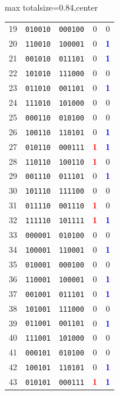 \documentclass[11pt]{article}
\theoremstyle{definition}
\begin{document}
\begin{table}[p]
\begin{adjustbox}{max totalsize={\textwidth}{0.84\textheight},center}
\begin{tabular}{@{}rcccc@{}}
19 & \texttt{010010} & \texttt{000100} & 0 & 0 \\
20 & \texttt{110010} & \texttt{100001} & 0 & \textbf{\textcolor{blue}{1}} \\
21 & \texttt{001010} & \texttt{011101} & 0 & \textbf{\textcolor{blue}{1}} \\
22 & \texttt{101010} & \texttt{111000} & 0 & 0 \\
23 & \texttt{011010} & \texttt{001101} & 0 & \textbf{\textcolor{blue}{1}} \\
24 & \texttt{111010} & \texttt{101000} & 0 & 0 \\
25 & \texttt{000110} & \texttt{010100} & 0 & 0 \\
26 & \texttt{100110} & \texttt{110101} & 0 & \textbf{\textcolor{blue}{1}} \\
27 & \texttt{010110} & \texttt{000111} & \textbf{\textcolor{red}{1}} & \textbf{\textcolor{blue}{1}} \\
28 & \texttt{110110} & \texttt{100110} & \textbf{\textcolor{red}{1}} & 0 \\
29 & \texttt{001110} & \texttt{011101} & 0 & \textbf{\textcolor{blue}{1}} \\
30 & \texttt{101110} & \texttt{111100} & 0 & 0 \\
31 & \texttt{011110} & \texttt{001110} & \textbf{\textcolor{red}{1}} & 0 \\
32 & \texttt{111110} & \texttt{101111} & \textbf{\textcolor{red}{1}} & \textbf{\textcolor{blue}{1}} \\
33 & \texttt{000001} & \texttt{010100} & 0 & 0 \\
34 & \texttt{100001} & \texttt{110001} & 0 & \textbf{\textcolor{blue}{1}} \\
35 & \texttt{010001} & \texttt{000100} & 0 & 0 \\
36 & \texttt{110001} & \texttt{100001} & 0 & \textbf{\textcolor{blue}{1}} \\
37 & \texttt{001001} & \texttt{011101} & 0 & \textbf{\textcolor{blue}{1}} \\
38 & \texttt{101001} & \texttt{111000} & 0 & 0 \\
39 & \texttt{011001} & \texttt{001101} & 0 & \textbf{\textcolor{blue}{1}} \\
40 & \texttt{111001} & \texttt{101000} & 0 & 0 \\
41 & \texttt{000101} & \texttt{010100} & 0 & 0 \\
42 & \texttt{100101} & \texttt{110101} & 0 & \textbf{\textcolor{blue}{1}} \\
43 & \texttt{010101} & \texttt{000111} & \textbf{\textcolor{red}{1}} & \textbf{\textcolor{blue}{1}} \\

\end{tabular}
\end{adjustbox}
\end{table}
\end{document}
